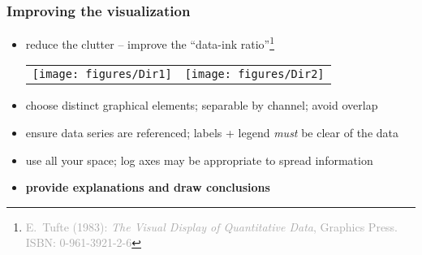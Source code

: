 \documentclass{beamer}
\newcommand{\eg}{\textit{e.g.},\xspace} %
\newcommand{\key}[1]{\textcolor{keyred}{{\bf #1}}}
\begin{document}
\begin{frame}
\frametitle{Improving the visualization}
\begin{itemize}
\item reduce the clutter -- improve the ``data-ink ratio''\footnote{\textcolor{darkgrey}{E.~Tufte (1983): {\it The Visual Display of Quantitative Data}, Graphics Press.\\ ISBN:  0-961-3921-2-6}}
\begin{center}
\begin{tabular}{cc}
\texttt{[image: figures/Dir1]}&
\texttt{[image: figures/Dir2]}
\end{tabular}
\end{center}
\item choose distinct graphical elements; separable by channel; avoid overlap
\item ensure data series are referenced; labels + legend \emph{must} be clear of the data
\item use all your space; log axes may be appropriate to spread information
\item \key{provide explanations and draw conclusions}
\end{itemize}
\end{frame}



\end{document}
